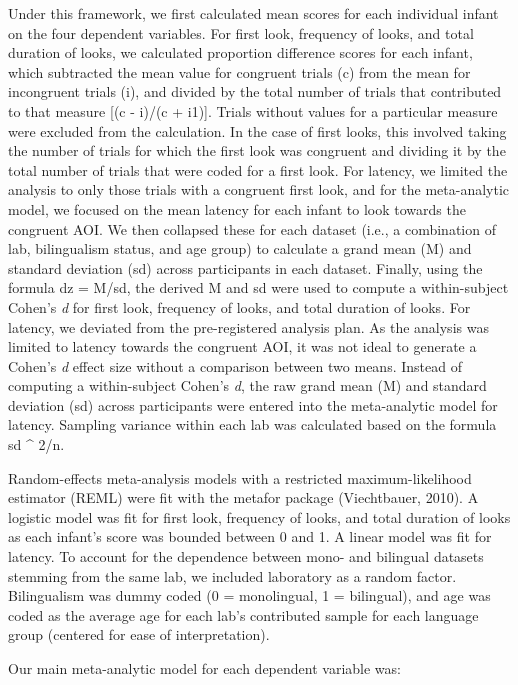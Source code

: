 \documentclass[,man,floatsintext]{apa6}
\begin{document}
Under this framework, we first calculated mean scores for each individual infant on the four dependent variables. For first look, frequency of looks, and total duration of looks, we calculated proportion difference scores for each infant, which subtracted the mean value for congruent trials (c) from the mean for incongruent trials (i), and divided by the total number of trials that contributed to that measure {[}(c - i)/(c + i1){]}. Trials without values for a particular measure were excluded from the calculation. In the case of first looks, this involved taking the number of trials for which the first look was congruent and dividing it by the total number of trials that were coded for a first look. For latency, we limited the analysis to only those trials with a congruent first look, and for the meta-analytic model, we focused on the mean latency for each infant to look towards the congruent AOI. We then collapsed these for each dataset (i.e., a combination of lab, bilingualism status, and age group) to calculate a grand mean (M) and standard deviation (sd) across participants in each dataset. Finally, using the formula dz = M/sd, the derived M and sd were used to compute a within-subject Cohen's \emph{d} for first look, frequency of looks, and total duration of looks. For latency, we deviated from the pre-registered analysis plan. As the analysis was limited to latency towards the congruent AOI, it was not ideal to generate a Cohen's \emph{d} effect size without a comparison between two means. Instead of computing a within-subject Cohen's \emph{d}, the raw grand mean (M) and standard deviation (sd) across participants were entered into the meta-analytic model for latency. Sampling variance within each lab was calculated based on the formula sd \^{} 2/n.

Random-effects meta-analysis models with a restricted maximum-likelihood estimator (REML) were fit with the metafor package (Viechtbauer, 2010). A logistic model was fit for first look, frequency of looks, and total duration of looks as each infant's score was bounded between 0 and 1. A linear model was fit for latency. To account for the dependence between mono- and bilingual datasets stemming from the same lab, we included laboratory as a random factor. Bilingualism was dummy coded (0 = monolingual, 1 = bilingual), and age was coded as the average age for each lab's contributed sample for each language group (centered for ease of interpretation).

Our main meta-analytic model for each dependent variable was:
\end{document}
